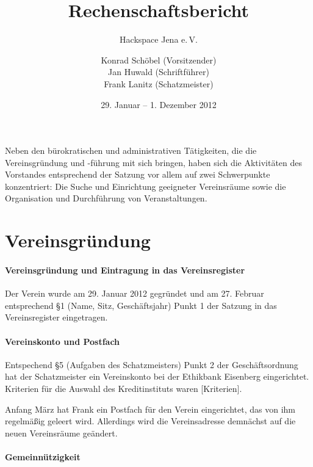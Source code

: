 \documentclass[10pt,DIV16]{scrartcl}
\title{Rechenschaftsbericht}
\subtitle{Hackspace Jena e.\,V.}
\author{%
	Konrad Schöbel (Vorsitzender)\\
	Jan Huwald (Schriftf\"uhrer)\\
	Frank Lanitz (Schatzmeister)
}
\date{29. Januar -- 1. Dezember 2012}
\begin{document}
\maketitle

\tableofcontents

Neben den bürokratischen und administrativen Tätigkeiten, die die
Vereinsgründung und -führung mit sich bringen, haben sich die Aktivitäten des
Vorstandes entsprechend der Satzung vor allem auf zwei Schwerpunkte
konzentriert:  Die Suche und Einrichtung geeigneter Vereinsräume sowie die
Organisation und Durchführung von Veranstaltungen.


\section{Vereinsgründung}

\paragraph{Vereinsgründung und Eintragung in das Vereinsregister}

Der Verein wurde am 29. Januar 2012 gegründet und am 27. Februar entsprechend
§1 (Name, Sitz, Geschäftsjahr) Punkt 1 der Satzung in das Vereinsregister
eingetragen.

\paragraph{Vereinskonto und Postfach}

Entspechend §5 (Aufgaben des Schatzmeisters) Punkt 2 der Geschäftsordnung hat
der Schatzmeister ein Vereinskonto bei der Ethikbank Eisenberg eingerichtet.
Kriterien für die Auswahl des Kreditinstituts waren [Kriterien].

Anfang März hat Frank ein Postfach für den Verein eingerichtet, das von ihm
regelmäßig geleert wird.  Allerdings wird die Vereinsadresse demnächst auf die
neuen Vereinsräume geändert.

\paragraph{Gemeinnützigkeit}
\end{document}
